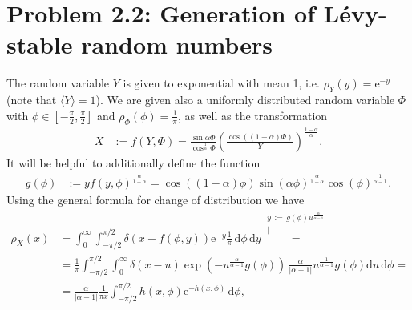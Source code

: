 \documentclass[english, parskip=full]{scrartcl}
\newcommand{\bra}{}
\newcommand{\kom}{}
\newcommand{\intx}{}
\newcommand{\kla}{}
\newcommand{\klam}{}
\newcommand{\tecxt}{}
\newcommand{\e}{\text{e}}
\begin{document}
\section*{Problem 2.2: Generation of L\'evy-stable random numbers}
The random variable $Y$ is given to exponential with mean 1, i.e. $\rho_Y(y)=\e^{-y}$ (note that $\bra\langle Y \rangle=1$).
We are given also a uniformly distributed random variable $\Phi$ with $\phi\in\klam\left[ -\frac{\pi}{2},\frac{\pi}{2} \right]$ and $\rho_\Phi(\phi)=\frac{1}{\pi}$, as well as the transformation
\begin{align}
X&:=f(Y,\Phi)=\frac{\sin\alpha\Phi}{\cos^\frac{1}{\alpha}\Phi}\kla\left( \frac{\cos((1-\alpha)\Phi)}{Y} \right)^\frac{1-\alpha}{\alpha}.
\end{align}
It will be helpful to additionally define the function
\begin{align}
g(\phi)&:=yf(y,\phi)^\frac{\alpha}{1-\alpha}=\cos ((1-\alpha)\phi)\sin\kla\left( \alpha\phi \right)^\frac{\alpha}{1-\alpha}\cos (\phi)^\frac{1}{\alpha-1}.
\end{align}
Using the general formula for change of distribution we have
\begin{align}
\rho_X(x)&=\intx\int_{0}^{\infty}\intx\int_{-\pi/2}^{\pi/2}\delta(x-f(\phi,y))\e^{-y}\frac{1}{\pi}\, \mathrm{d}\phi\, \mathrm{d}y\kom\overset{\substack{{y\,:=\,g(\phi)u^\frac{\alpha}{\alpha-1}} \\ |}}{=}\\
&=\frac{1}{\pi}\intx\int_{-\pi/2}^{\pi/2}\intx\int_{0}^{\infty}\delta(x-u)\exp\kla\left( -u^\frac{\alpha}{\alpha-1}g(\phi) \right)\, \frac{\alpha}{|\alpha -1|}u^\frac{1}{\alpha-1}g(\phi)\mathrm{d}u\, \mathrm{d}\phi=\\
&=\frac{\alpha}{|\alpha -1|}\frac{1}{\pi x}\intx\int_{-\pi/2}^{\pi/2}h(x,\phi)\e^{-h(x,\phi)}\, \mathrm{d}\phi, \label{eqn:rho x as integral}
\end{align}
\end{document}
